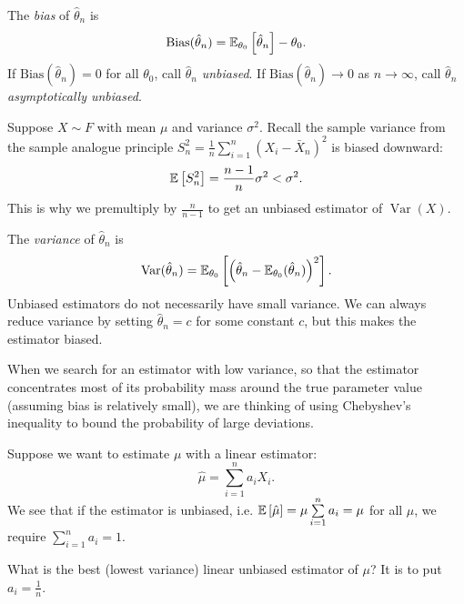 \begin{definition}[Bias]
	The \emph{bias} of $\hat\theta_n$ is
	\[
		\text{Bias}(\hat\theta_n)=\mathbb{E}_{\theta_0}\left[\hat\theta_n\right]-\theta_0.
	\]
	If $\text{Bias}(\hat\theta_n)=0$ for all $\theta_0$, call $\hat\theta_n$ \emph{unbiased}. If $\text{Bias}(\hat\theta_n)\to 0$ as $n\to\infty$, call $\hat\theta_n$ \emph{asymptotically unbiased}.
\end{definition}

\begin{remark}	Suppose $X \sim F$ with mean $\mu$ and variance $\sigma^2$. Recall the sample variance from the sample analogue principle $S_n^2=\frac{1}{n}\sum_{i=1}^n (X_i-\bar{X}_n)^2$ is biased downward:
	\[
		\mathbb{E}\left[S_n^2\right]=\frac{n-1}{n}\sigma^2<\sigma^2.
	\] This is why we premultiply by $\frac{n}{n-1}$ to get an unbiased estimator of $\operatorname{Var}\left(X\right)$.
\end{remark}

\begin{definition}
	The \emph{variance} of $\hat\theta_n$ is
	\[
		\operatorname{Var}(\hat\theta_n)=\mathbb{E}_{\theta_0}\left[\left(\hat\theta_n-\mathbb{E}_{\theta_0}(\hat\theta_n)\right)^2\right].
	\]
	Unbiased estimators do not necessarily have small variance. We can always reduce variance by setting $\hat\theta_n=c$ for some constant $c$, but this makes the estimator biased.

	When we search for an estimator with low variance, so that the estimator concentrates most of its probability mass around the true parameter value (assuming bias is relatively small), we are thinking of using Chebyshev's inequality to bound the probability of large deviations.
\end{definition}

\begin{example}
	Suppose we want to estimate $\mu$ with a linear estimator: \[
		\hat{\mu} = \sum\limits_{i=1}^{n} a_iX_i
	.\] We see that if the estimator is unbiased, i.e. $\mathbb{E}\left[\hat{\mu}\right] = \mu \sum\limits_{i=1}^{n} a_i = \mu$ for all $\mu$, we require $\sum\limits_{i=1}^{n} a_i = 1$.

	What is the best (lowest variance) linear unbiased estimator of $\mu$? It is to put $a_i = \frac{1}{n}$.
\end{example}


